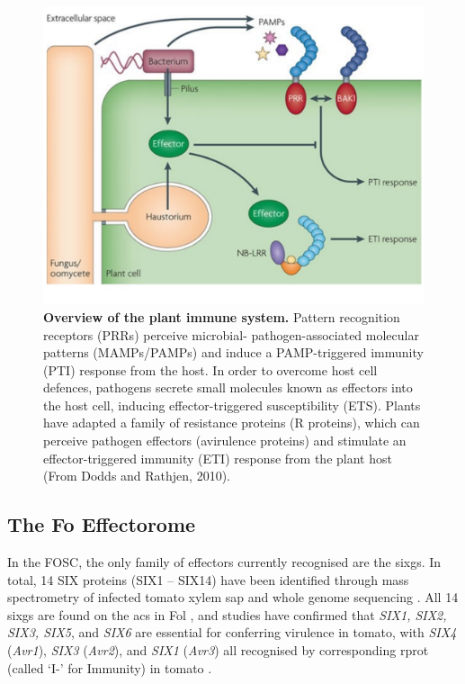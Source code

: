 \begin{figure}[h]
    \centering
    \includegraphics[width=14cm]{Figures/DoddsArticleModel.pdf}
    \caption[Overview of the plant immune system.]{\textbf{Overview of the plant immune system.} Pattern recognition receptors (PRRs) perceive microbial- pathogen-associated molecular patterns (MAMPs/PAMPs) and induce a PAMP-triggered immunity (PTI) response from the host. In order to overcome host cell defences, pathogens secrete small molecules known as effectors into the host cell, inducing effector-triggered susceptibility (ETS). Plants have adapted a family of resistance proteins (R proteins), which can perceive pathogen effectors (avirulence proteins) and stimulate an effector-triggered immunity (ETI) response from the plant host (From Dodds and Rathjen, 2010).}
    \label{fig:PlantImmuneSystem}
\end{figure}


\subsection{The \acl{Fo} Effectorome}
\label{Chap1:fusariumEffectorome}

In the \ac{FOSC}, the only family of effectors currently recognised are the \acp{sixg}. In total, 14 SIX proteins (SIX1 – SIX14) have been identified through mass spectrometry of infected tomato xylem sap and whole genome sequencing \parencite{Houterman2007}.  All 14 \acp{sixg} are found on the \acp{ac} in \ac{Fol} \parencite{Schmidt2013}, and studies have confirmed that \textit{SIX1, SIX2, SIX3, SIX5}, and \textit{SIX6} are essential for conferring virulence in tomato, with  \textit{SIX4} (\textit{Avr1}), \textit{SIX3} (\textit{Avr2}), and \textit{SIX1} (\textit{Avr3}) all recognised by corresponding \ac{rprot} (called ‘I-’ for Immunity) in tomato \parencite{Rep2004, Lievens2009, Takken2010, Gawehns2014, Ma2015}.  

